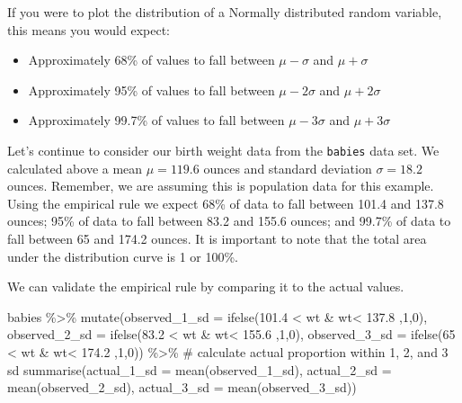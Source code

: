 \documentclass[
  letterpaper,
  DIV=11,
  numbers=noendperiod]{scrreprt}
\newenvironment{Shaded}{\begin{snugshade}}{\end{snugshade}}
\newcommand{\AttributeTok}[1]{\textcolor[rgb]{0.40,0.45,0.13}{#1}}
\newcommand{\CommentTok}[1]{\textcolor[rgb]{0.37,0.37,0.37}{#1}}
\newcommand{\DecValTok}[1]{\textcolor[rgb]{0.68,0.00,0.00}{#1}}
\newcommand{\FloatTok}[1]{\textcolor[rgb]{0.68,0.00,0.00}{#1}}
\newcommand{\FunctionTok}[1]{\textcolor[rgb]{0.28,0.35,0.67}{#1}}
\newcommand{\NormalTok}[1]{\textcolor[rgb]{0.00,0.23,0.31}{#1}}
\newcommand{\SpecialCharTok}[1]{\textcolor[rgb]{0.37,0.37,0.37}{#1}}
\providecommand{\tightlist}{%
  \setlength{\itemsep}{0pt}\setlength{\parskip}{0pt}}\usepackage{longtable,booktabs,array}
\theoremstyle{definition}
\theoremstyle{remark}
\begin{document}
If you were to plot the distribution of a Normally distributed random
variable, this means you would expect:

\begin{itemize}
\tightlist
\item
  Approximately 68\% of values to fall between \(\mu-\sigma\) and
  \(\mu+\sigma\)
\item
  Approximately 95\% of values to fall between \(\mu-2\sigma\) and
  \(\mu+2\sigma\)
\item
  Approximately 99.7\% of values to fall between \(\mu-3\sigma\) and
  \(\mu+3\sigma\)
\end{itemize}

Let's continue to consider our birth weight data from the
\texttt{babies} data set. We calculated above a mean \(\mu= 119.6\)
ounces and standard deviation \(\sigma=18.2\) ounces. Remember, we are
assuming this is population data for this example. Using the empirical
rule we expect 68\% of data to fall between 101.4 and 137.8 ounces; 95\%
of data to fall between 83.2 and 155.6 ounces; and 99.7\% of data to
fall between 65 and 174.2 ounces. It is important to note that the total
area under the distribution curve is 1 or 100\%.

We can validate the empirical rule by comparing it to the actual values.

\begin{Shaded}
\begin{Highlighting}[]
\NormalTok{babies }\SpecialCharTok{\%\textgreater{}\%} 
  \FunctionTok{mutate}\NormalTok{(}\AttributeTok{observed\_1\_sd =} \FunctionTok{ifelse}\NormalTok{(}\FloatTok{101.4} \SpecialCharTok{\textless{}}\NormalTok{ wt }\SpecialCharTok{\&}\NormalTok{ wt}\SpecialCharTok{\textless{}} \FloatTok{137.8}\NormalTok{ ,}\DecValTok{1}\NormalTok{,}\DecValTok{0}\NormalTok{),}
         \AttributeTok{observed\_2\_sd =} \FunctionTok{ifelse}\NormalTok{(}\FloatTok{83.2} \SpecialCharTok{\textless{}}\NormalTok{ wt }\SpecialCharTok{\&}\NormalTok{ wt}\SpecialCharTok{\textless{}} \FloatTok{155.6}\NormalTok{ ,}\DecValTok{1}\NormalTok{,}\DecValTok{0}\NormalTok{),}
         \AttributeTok{observed\_3\_sd =} \FunctionTok{ifelse}\NormalTok{(}\DecValTok{65} \SpecialCharTok{\textless{}}\NormalTok{ wt }\SpecialCharTok{\&}\NormalTok{ wt}\SpecialCharTok{\textless{}} \FloatTok{174.2}\NormalTok{ ,}\DecValTok{1}\NormalTok{,}\DecValTok{0}\NormalTok{)) }\SpecialCharTok{\%\textgreater{}\%} 
  \CommentTok{\# calculate actual proportion within 1, 2, and 3 sd}
  \FunctionTok{summarise}\NormalTok{(}\AttributeTok{actual\_1\_sd =} \FunctionTok{mean}\NormalTok{(observed\_1\_sd),}
            \AttributeTok{actual\_2\_sd =} \FunctionTok{mean}\NormalTok{(observed\_2\_sd),}
            \AttributeTok{actual\_3\_sd =} \FunctionTok{mean}\NormalTok{(observed\_3\_sd))}
\end{Highlighting}
\end{Shaded}
\end{document}
